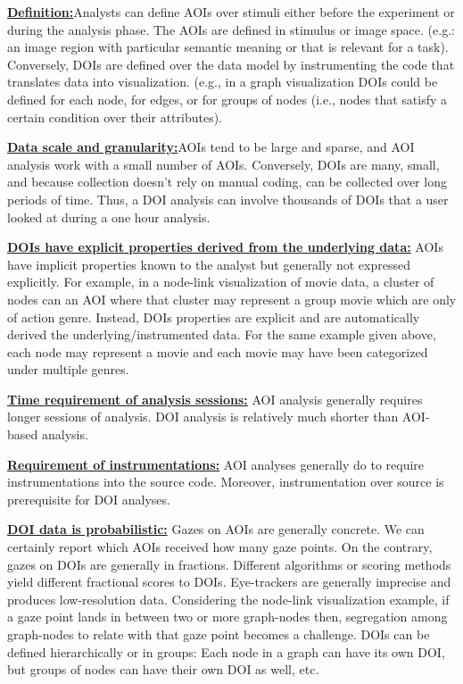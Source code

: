 \textbf{\underline{Definition:}}Analysts can define AOIs over stimuli either before the experiment or during the analysis phase. The AOIs are defined in stimulus or image space. (e.g.: an image region with particular semantic meaning or that is relevant for a task). Conversely, DOIs are defined over the data model by instrumenting the code that translates data into visualization.   (e.g., in a graph visualization DOIs could be defined for each node, for edges, or for groups of nodes (i.e., nodes that satisfy a certain condition over their attributes).


\textbf{\underline{Data scale and granularity:}}AOIs tend to be large and sparse, and AOI analysis work with a small number of AOIs. Conversely, DOIs are many, small, and because collection doesn't rely on manual coding, can be collected over long periods of time. Thus, a DOI analysis can involve thousands of DOIs that a user looked at during a one hour analysis.

\textbf{\uline{DOIs have explicit properties derived from the underlying data:}} AOIs have implicit properties known to the analyst but generally not expressed explicitly. For example, in a node-link visualization of movie data, a cluster of nodes can an AOI where that cluster may represent a group movie which are only of action genre. Instead, DOIs properties are explicit and are automatically derived the underlying/instrumented data. For the same example given above, each node may represent a movie and each movie may have been categorized under multiple genres. 

\textbf{\underline{Time requirement of analysis sessions:}} AOI analysis generally requires longer sessions of analysis. DOI analysis is relatively much shorter than AOI-based analysis.

\textbf{\underline{Requirement of instrumentations:}} AOI analyses generally do to require instrumentations into the source code. Moreover, instrumentation over source is prerequisite for DOI analyses. 

\textbf{\underline{DOI data is probabilistic:}}  Gazes on AOIs are generally concrete. We can certainly report which AOIs received how many gaze points. On the contrary, gazes on DOIs are generally in fractions. Different algorithms or scoring methods yield different fractional scores to DOIs. Eye-trackers are generally imprecise and produces low-resolution data. Considering the node-link visualization example, if a gaze point lands in between two or more graph-nodes then, segregation among graph-nodes to relate with that gaze point becomes a challenge. 
DOIs can be defined hierarchically or in groups: Each node in a graph can have its own DOI, but groups of nodes can have their own DOI as well, etc.




